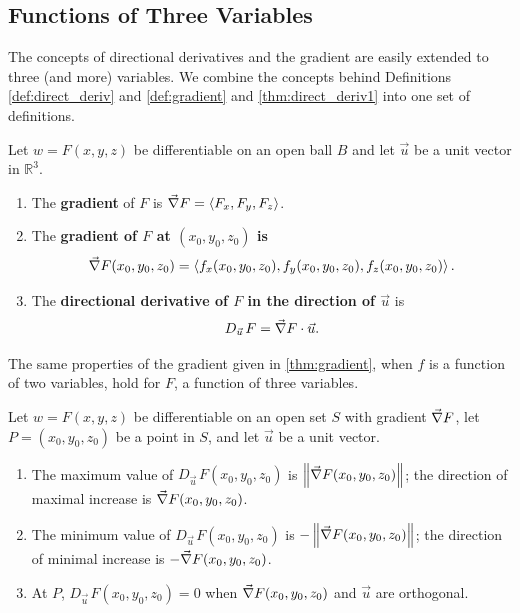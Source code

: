 \subsection{Functions of Three Variables}

The concepts of directional derivatives and the gradient are easily extended to three (and more) variables. We combine the concepts behind Definitions \ref{def:direct_deriv} and \ref{def:gradient} and \autoref{thm:direct_deriv1} into one set of definitions.

\begin{definition}\label{def:direct_deriv3}%
Let $w=F(x,y,z)$ be differentiable on an open ball $B$ and let $\vec u $ be a unit vector in $\mathbb{R}^3$.
\begin{enumerate}
	\item	The \textbf{gradient} of $F$ is $\vec\nabla F =\left\langle F_x,F_y,F_z\right\rangle$.
	\item The \textbf{gradient of $F$ at $(x_0,y_0,z_0)$ is
	\[\vec\nabla F(x_0,y_0,z_0) =\left\langle f_x(x_0,y_0,z_0),f_y(x_0,y_0,z_0),f_z(x_0,y_0,z_0)\right\rangle.\]}
	\item The \textbf{directional derivative of $F$ in the direction of $\vec u$} is
	\[D_{\vec u\,}F=\vec\nabla F\cdot \vec u.\]
\end{enumerate}
\end{definition}

The same properties of the gradient given in \autoref{thm:gradient}, when $f$ is a function of two variables, hold for $F$, a function of three variables.

{
\begin{theorem}\label{thm:gradient3}%
Let $w=F(x,y,z)$ be differentiable on an open set $S$ with gradient $\vec\nabla F$, let $P=(x_0,y_0,z_0)$ be a point in $S$, and let $\vec u$ be a unit vector.
\begin{enumerate}
	\item The maximum value of $D_{\vec u\,}F(x_0,y_0,z_0)$ is $\left\lVert \vec\nabla F(x_0,y_0,z_0) \right\rVert$; %
	 the direction of maximal increase is $\vec\nabla F(x_0,y_0,z_0)$.
	\item The minimum value of $D_{\vec u\,}F(x_0,y_0,z_0)$ is $-\left\lVert \vec\nabla F(x_0,y_0,z_0) \right\rVert$; %
	 the direction of minimal increase is $-\vec\nabla F(x_0,y_0,z_0)$.
	\item At $P$, $D_{\vec u\,}F(x_0,y_0,z_0) = 0$ when $\vec\nabla F(x_0,y_0,z_0)$ and $\vec u$ are orthogonal.
\end{enumerate}
\end{theorem}}

